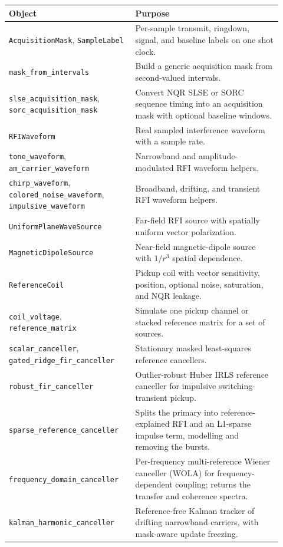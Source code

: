 \documentclass[11pt,oneside]{report}
\newcommand{\code}[1]{\texttt{#1}}
\begin{document}
\begin{longtable}{p{0.42\linewidth}p{0.50\linewidth}}
\toprule
Object & Purpose \\
\midrule
\code{AcquisitionMask}, \code{SampleLabel} & Per-sample transmit, ringdown, signal, and baseline labels on one shot clock. \\
\code{mask\_from\_intervals} & Build a generic acquisition mask from second-valued intervals. \\
\code{slse\_acquisition\_mask}, \code{sorc\_acquisition\_mask} & Convert NQR SLSE or SORC sequence timing into an acquisition mask with optional baseline windows. \\
\code{RFIWaveform} & Real sampled interference waveform with a sample rate. \\
\code{tone\_waveform}, \code{am\_carrier\_waveform} & Narrowband and amplitude-modulated RFI waveform helpers. \\
\code{chirp\_waveform}, \code{colored\_noise\_waveform}, \code{impulsive\_waveform} & Broadband, drifting, and transient RFI waveform helpers. \\
\code{UniformPlaneWaveSource} & Far-field RFI source with spatially uniform vector polarization. \\
\code{MagneticDipoleSource} & Near-field magnetic-dipole source with \(1/r^3\) spatial dependence. \\
\code{ReferenceCoil} & Pickup coil with vector sensitivity, position, optional noise, saturation, and NQR leakage. \\
\code{coil\_voltage}, \code{reference\_matrix} & Simulate one pickup channel or stacked reference matrix for a set of sources. \\
\code{scalar\_canceller}, \code{gated\_ridge\_fir\_canceller} & Stationary masked least-squares reference cancellers. \\
\code{robust\_fir\_canceller} & Outlier-robust Huber IRLS reference canceller for impulsive switching-transient pickup. \\
\code{sparse\_reference\_canceller} & Splits the primary into reference-explained RFI and an L1-sparse impulse term, modelling and removing the bursts. \\
\code{frequency\_domain\_canceller} & Per-frequency multi-reference Wiener canceller (WOLA) for frequency-dependent coupling; returns the transfer and coherence spectra. \\
\code{kalman\_harmonic\_canceller} & Reference-free Kalman tracker of drifting narrowband carriers, with mask-aware update freezing. \\

\end{longtable}
\end{document}
